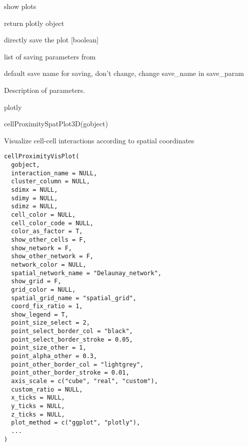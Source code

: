 \documentclass[a4paper]{book}
\begin{document}
\begin{Arguments}
\begin{ldescription}
\item[\code{show\_plot}] show plots

\item[\code{return\_plot}] return plotly object

\item[\code{save\_plot}] directly save the plot [boolean]

\item[\code{save\_param}] list of saving parameters from 

\item[\code{default\_save\_name}] default save name for saving, don't change, change save\_name in save\_param
\end{ldescription}
\end{Arguments}
%
\begin{Details}\relax
Description of parameters.
\end{Details}
%
\begin{Value}
plotly
\end{Value}
%
\begin{Examples}
\begin{ExampleCode}
    cellProximitySpatPlot3D(gobject)
\end{ExampleCode}
\end{Examples}
%
\begin{Description}\relax
Visualize cell-cell interactions according to spatial coordinates
\end{Description}
%
\begin{Usage}
\begin{verbatim}
cellProximityVisPlot(
  gobject,
  interaction_name = NULL,
  cluster_column = NULL,
  sdimx = NULL,
  sdimy = NULL,
  sdimz = NULL,
  cell_color = NULL,
  cell_color_code = NULL,
  color_as_factor = T,
  show_other_cells = F,
  show_network = F,
  show_other_network = F,
  network_color = NULL,
  spatial_network_name = "Delaunay_network",
  show_grid = F,
  grid_color = NULL,
  spatial_grid_name = "spatial_grid",
  coord_fix_ratio = 1,
  show_legend = T,
  point_size_select = 2,
  point_select_border_col = "black",
  point_select_border_stroke = 0.05,
  point_size_other = 1,
  point_alpha_other = 0.3,
  point_other_border_col = "lightgrey",
  point_other_border_stroke = 0.01,
  axis_scale = c("cube", "real", "custom"),
  custom_ratio = NULL,
  x_ticks = NULL,
  y_ticks = NULL,
  z_ticks = NULL,
  plot_method = c("ggplot", "plotly"),
  ...
)
\end{verbatim}
\end{Usage}
\end{document}
